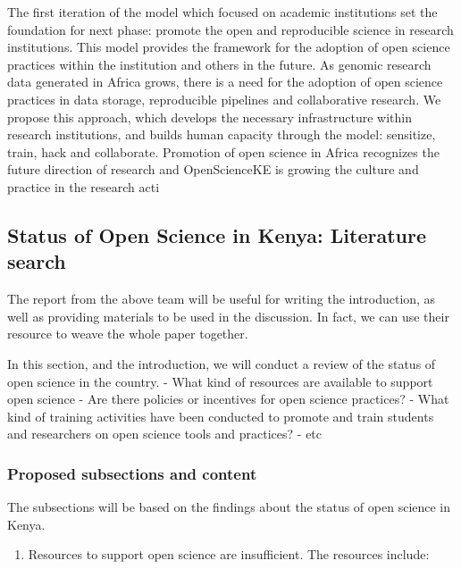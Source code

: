 The first iteration of the model which focused on academic institutions
set the foundation for next phase: promote the open and reproducible
science in research institutions. This model provides the framework for
the adoption of open science practices within the institution and others
in the future. As genomic research data generated in Africa grows, there
is a need for the adoption of open science practices in data storage,
reproducible pipelines and collaborative research. We propose this
approach, which develops the necessary infrastructure within research
institutions, and builds human capacity through the model: sensitize,
train, hack and collaborate. Promotion of open science in Africa
recognizes the future direction of research and OpenScienceKE is growing
the culture and practice in the research acti

\subsection*{Status of Open Science in Kenya: Literature
search}\label{status-of-open-science-in-kenya-literature-search}

The report from the above team will be useful for writing the
introduction, as well as providing materials to be used in the
discussion. In fact, we can use their resource to weave the whole paper
together.

In this section, and the introduction, we will conduct a review of the
status of open science in the country. - What kind of resources are
available to support open science - Are there policies or incentives for
open science practices? - What kind of training activities have been
conducted to promote and train students and researchers on open science
tools and practices? - etc

\subsubsection{Proposed subsections and
content}\label{proposed-subsections-and-content}

The subsections will be based on the findings about the status of open
science in Kenya.

\begin{enumerate}
\def\labelenumi{\arabic{enumi}.}
\tightlist
\item
  Resources to support open science are insufficient. The resources
  include:
\end{enumerate}

